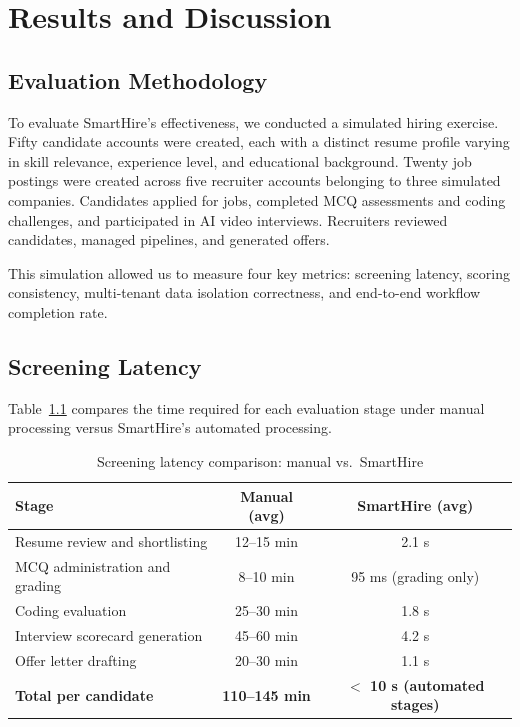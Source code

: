 \setcounter{chapter}{6}
\chapter{Results and Discussion}
\label{ch:results}

\section{Evaluation Methodology}
\label{sec:eval-method}

To evaluate SmartHire's effectiveness, we conducted a simulated hiring exercise. Fifty candidate accounts were created, each with a distinct resume profile varying in skill relevance, experience level, and educational background. Twenty job postings were created across five recruiter accounts belonging to three simulated companies. Candidates applied for jobs, completed MCQ assessments and coding challenges, and participated in AI video interviews. Recruiters reviewed candidates, managed pipelines, and generated offers.

This simulation allowed us to measure four key metrics: screening latency, scoring consistency, multi-tenant data isolation correctness, and end-to-end workflow completion rate.

\section{Screening Latency}
\label{sec:latency-results}

Table~\ref{tab:latency} compares the time required for each evaluation stage under manual processing versus SmartHire's automated processing.

\begin{table}[htbp]
\centering
\caption{Screening latency comparison: manual vs.\ SmartHire}
\label{tab:latency}
\small
\begin{tabular}{p{2.2in}cc}
\toprule
\textbf{Stage} & \textbf{Manual (avg)} & \textbf{SmartHire (avg)} \\
\midrule
Resume review and shortlisting   & 12--15 min   & 2.1 s \\
MCQ administration and grading   & 8--10 min    & 95 ms (grading only) \\
Coding evaluation                & 25--30 min   & 1.8 s \\
Interview scorecard generation   & 45--60 min   & 4.2 s \\
Offer letter drafting            & 20--30 min   & 1.1 s \\
\midrule
\textbf{Total per candidate}     & \textbf{110--145 min} & \textbf{$<$ 10 s (automated stages)} \\
\bottomrule
\end{tabular}
\end{table}

